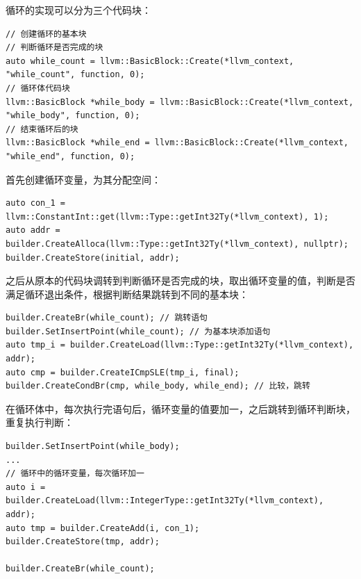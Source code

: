 \documentclass[lang=cn,11pt,a4paper,cite=authornum]{paper}
\begin{document}
循环的实现可以分为三个代码块：

\begin{code}
    \begin{verbatim}
// 创建循环的基本块
// 判断循环是否完成的块
auto while_count = llvm::BasicBlock::Create(*llvm_context, "while_count", function, 0);
// 循环体代码块
llvm::BasicBlock *while_body = llvm::BasicBlock::Create(*llvm_context, "while_body", function, 0);
// 结束循环后的块
llvm::BasicBlock *while_end = llvm::BasicBlock::Create(*llvm_context, "while_end", function, 0);
\end{verbatim}
\end{code}

首先创建循环变量，为其分配空间：

\begin{code}
    \begin{verbatim}
auto con_1 = llvm::ConstantInt::get(llvm::Type::getInt32Ty(*llvm_context), 1);
auto addr = builder.CreateAlloca(llvm::Type::getInt32Ty(*llvm_context), nullptr);
builder.CreateStore(initial, addr);
\end{verbatim}
\end{code}

之后从原本的代码块调转到判断循环是否完成的块，取出循环变量的值，判断是否满足循环退出条件，根据判断结果跳转到不同的基本块：

\begin{code}
    \begin{verbatim}
builder.CreateBr(while_count); // 跳转语句
builder.SetInsertPoint(while_count); // 为基本块添加语句
auto tmp_i = builder.CreateLoad(llvm::Type::getInt32Ty(*llvm_context), addr);
auto cmp = builder.CreateICmpSLE(tmp_i, final);
builder.CreateCondBr(cmp, while_body, while_end); // 比较，跳转
\end{verbatim}
\end{code}

在循环体中，每次执行完语句后，循环变量的值要加一，之后跳转到循环判断块，重复执行判断：

\begin{code}
    \begin{verbatim}
builder.SetInsertPoint(while_body);
...
// 循环中的循环变量，每次循环加一
auto i = builder.CreateLoad(llvm::IntegerType::getInt32Ty(*llvm_context), addr);
auto tmp = builder.CreateAdd(i, con_1);
builder.CreateStore(tmp, addr);

builder.CreateBr(while_count);
\end{verbatim}
\end{code}
\end{document}
